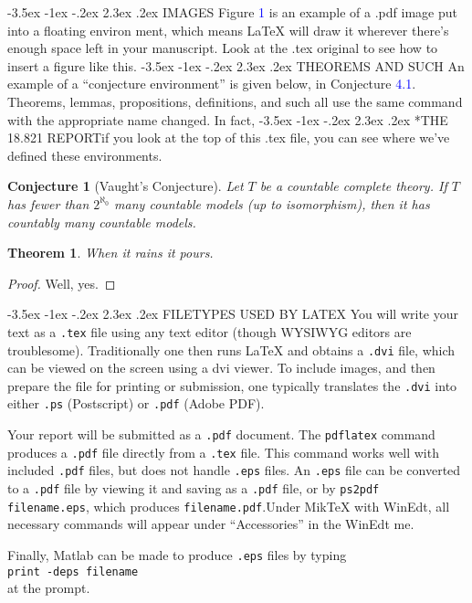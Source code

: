 \documentclass{article}
\makeatletter
\newtheorem{conjecture}{Conjecture}[section]
\newtheorem{theorem}{Theorem}[section]
\renewcommand\section{\@startsection {section}{1}{\z@}%
	{-3.5ex \@plus -1ex \@minus -.2ex}%
	{2.3ex \@plus.2ex}%
	{\normalfont\Large}}
\makeatother
\begin{document}
\section{IMAGES}
Figure \textcolor{blue}{1} is an example of a .pdf image put into a ﬂoating environ­
ment, which means LaTeX will draw it wherever there’s enough space
left in your manuscript. Look at the .tex original to see how to insert
a ﬁgure like this.
\section{THEOREMS AND SUCH}
An example of a “conjecture environment” is given below, in Con­jecture \textcolor{blue}{4.1}. Theorems, lemmas, propositions, deﬁnitions, and such all
use the same command with the appropriate name changed. In fact,
\newpage \section*{THE 18.821 REPORT}if you look at the top of this .tex ﬁle, you can see where we’ve deﬁned these environments.\\
\begin{conjecture}[Vaught's Conjecture]Let $T$ be a countable complete theory. If $T$ has fewer than $2^{\aleph_0}$ many countable models (up to isomorphism), then it has countably many countable models.
\end{conjecture}

\begin{theorem}
	When it rains it pours.
\end{theorem}
\begin{proof}
	Well, yes.
\end{proof}
\section{FILETYPES USED BY LATEX}
You will write your text as  a \texttt{.tex} file using any text editor (though WYSIWYG editors are troublesome). Traditionally one then runs \LaTeX{} and obtains a \texttt{.dvi} file, which can be viewed on the screen using a dvi viewer. To include images, and then prepare the file for printing or submission, one typically translates the \texttt{.dvi} into either \texttt{.ps} (Postscript) or \texttt{.pdf} (Adobe PDF).
\par{}\hspace{0.5 cm}Your report will be submitted as a \texttt{.pdf} document. The \texttt{pdflatex} command produces a \texttt{.pdf} file directly from a \texttt{.tex} file. This command works well with included \texttt{.pdf} files, but does not handle \texttt{.eps} files. An \texttt{.eps} file can be converted to a \texttt{.pdf} file by viewing it and saving as a \texttt{.pdf} file, or by \texttt{ps2pdf filename.eps}, which produces \texttt{filename.pdf}.Under MikTeX with WinEdt, all necessary commands will appear under “Accessories” in the WinEdt me.
\par{}\hspace{0.5 cm} Finally, Matlab can be made to produce \texttt{.eps} files by typing\\
\hspace{3 cm} \texttt{print -deps filename}\\ at the prompt.
\end{document}
